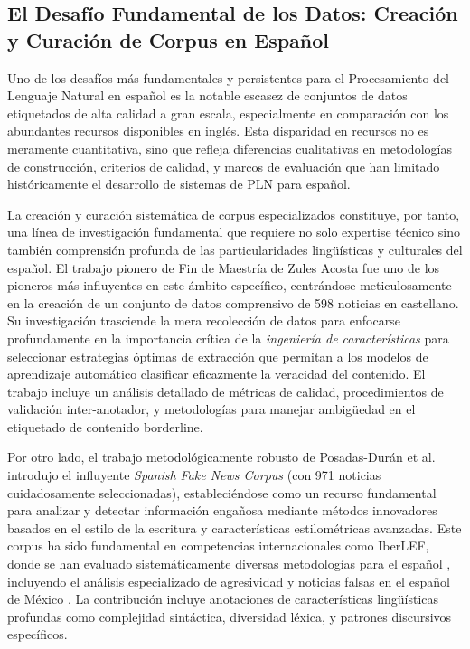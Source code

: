 \subsection{El Desafío Fundamental de los Datos: Creación y Curación de Corpus en Español}

Uno de los desafíos más fundamentales y persistentes para el Procesamiento del Lenguaje Natural en español es la notable escasez de conjuntos de datos etiquetados de alta calidad a gran escala, especialmente en comparación con los abundantes recursos disponibles en inglés. Esta disparidad en recursos no es meramente cuantitativa, sino que refleja diferencias cualitativas en metodologías de construcción, criterios de calidad, y marcos de evaluación que han limitado históricamente el desarrollo de sistemas de PLN para español.

La creación y curación sistemática de corpus especializados constituye, por tanto, una línea de investigación fundamental que requiere no solo expertise técnico sino también comprensión profunda de las particularidades lingüísticas y culturales del español. El trabajo pionero de Fin de Maestría de Zules Acosta \cite{acosta2019construccion} fue uno de los pioneros más influyentes en este ámbito específico, centrándose meticulosamente en la creación de un conjunto de datos comprensivo de 598 noticias en castellano. Su investigación trasciende la mera recolección de datos para enfocarse profundamente en la importancia crítica de la \textit{ingeniería de características} para seleccionar estrategias óptimas de extracción que permitan a los modelos de aprendizaje automático clasificar eficazmente la veracidad del contenido. El trabajo incluye un análisis detallado de métricas de calidad, procedimientos de validación inter-anotador, y metodologías para manejar ambigüedad en el etiquetado de contenido borderline.

Por otro lado, el trabajo metodológicamente robusto de Posadas-Durán et al. \cite{posadas2019detection} introdujo el influyente \textit{Spanish Fake News Corpus} (con 971 noticias cuidadosamente seleccionadas), estableciéndose como un recurso fundamental para analizar y detectar información engañosa mediante métodos innovadores basados en el estilo de la escritura y características estilométricas avanzadas. Este corpus ha sido fundamental en competencias internacionales como IberLEF, donde se han evaluado sistemáticamente diversas metodologías para el español \cite{gomez2021overview}, incluyendo el análisis especializado de agresividad y noticias falsas en el español de México \cite{aragon2020overview}. La contribución incluye anotaciones de características lingüísticas profundas como complejidad sintáctica, diversidad léxica, y patrones discursivos específicos.

